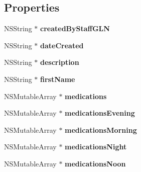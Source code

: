 \subsection*{Properties}
\begin{DoxyCompactItemize}
\item 
\hypertarget{interfacetrsp_prescription_a8bbb186bf117997032f33ae1a570263a}{}N\+S\+String $\ast$ {\bfseries created\+By\+Staff\+G\+L\+N}\label{interfacetrsp_prescription_a8bbb186bf117997032f33ae1a570263a}

\item 
\hypertarget{interfacetrsp_prescription_a9e073466669b248a038069c0cbf21692}{}N\+S\+String $\ast$ {\bfseries date\+Created}\label{interfacetrsp_prescription_a9e073466669b248a038069c0cbf21692}

\item 
\hypertarget{interfacetrsp_prescription_af7a7001f7e15f7b557b904a9bb0b88f7}{}N\+S\+String $\ast$ {\bfseries description}\label{interfacetrsp_prescription_af7a7001f7e15f7b557b904a9bb0b88f7}

\item 
\hypertarget{interfacetrsp_prescription_a281673d79d3e20d661f873f1492d60df}{}N\+S\+String $\ast$ {\bfseries first\+Name}\label{interfacetrsp_prescription_a281673d79d3e20d661f873f1492d60df}

\item 
\hypertarget{interfacetrsp_prescription_a614e81378b07bd378821264ce06c54b1}{}N\+S\+Mutable\+Array $\ast$ {\bfseries medications}\label{interfacetrsp_prescription_a614e81378b07bd378821264ce06c54b1}

\item 
\hypertarget{interfacetrsp_prescription_a852976d411c4b71561464aaf8f7b1cfc}{}N\+S\+Mutable\+Array $\ast$ {\bfseries medications\+Evening}\label{interfacetrsp_prescription_a852976d411c4b71561464aaf8f7b1cfc}

\item 
\hypertarget{interfacetrsp_prescription_a7f2eb01334a5bfd2713d47b2a3f73399}{}N\+S\+Mutable\+Array $\ast$ {\bfseries medications\+Morning}\label{interfacetrsp_prescription_a7f2eb01334a5bfd2713d47b2a3f73399}

\item 
\hypertarget{interfacetrsp_prescription_acef380e0609423ecc107dcee8fe841d1}{}N\+S\+Mutable\+Array $\ast$ {\bfseries medications\+Night}\label{interfacetrsp_prescription_acef380e0609423ecc107dcee8fe841d1}

\item 
\hypertarget{interfacetrsp_prescription_ad9efc8c04b90f0fa6ca90a96aad362d8}{}N\+S\+Mutable\+Array $\ast$ {\bfseries medications\+Noon}\label{interfacetrsp_prescription_ad9efc8c04b90f0fa6ca90a96aad362d8}


\end{DoxyCompactItemize}
